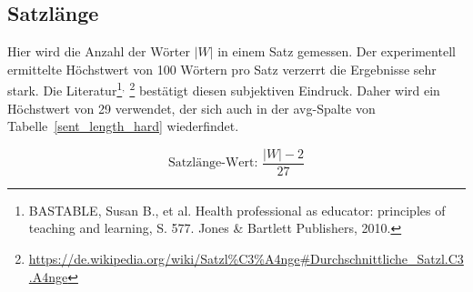 \documentclass[10pt,a4paper]{article}
\begin{document}
	\subsection*{Satzlänge}
	Hier wird die Anzahl der Wörter $ |W| $ in einem Satz gemessen. Der experimentell ermittelte Höchstwert von 100 Wörtern pro Satz verzerrt die Ergebnisse sehr stark. Die Literatur\footnote{BASTABLE, Susan B., et al. Health professional as educator: principles of teaching and learning, S. 577. Jones \& Bartlett Publishers, 2010.}$ ^, $ \footnote{\url{https://de.wikipedia.org/wiki/Satzl\%C3\%A4nge\#Durchschnittliche_Satzl.C3.A4nge}} bestätigt diesen subjektiven Eindruck. Daher wird ein Höchstwert von 29 verwendet, der sich auch in der avg-Spalte von Tabelle~\ref{sent_length_hard} wiederfindet.
		
	\begin{equation*}
		\text{Satzlänge-Wert: }\frac{|W|-2}{27}
	\end{equation*}	
	
\end{document}
